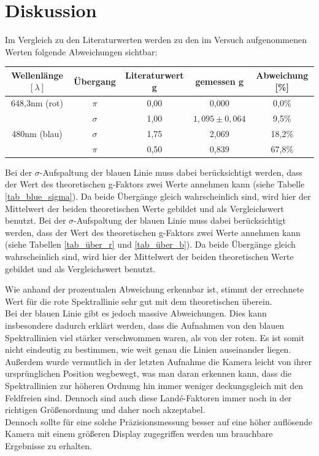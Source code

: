 \section{Diskussion}
Im Vergleich zu den Literaturwerten werden zu den im Versuch aufgenommenen Werten folgende Abweichungen sichtbar:
\begin{table}[htbp]
\begin{tabular}{|c|c|c|c|c|}
Wellenlänge $[\lambda]$ & Übergang & Literaturwert g& gemessen g& Abweichung [\%]\\\hline
648,3nm (rot) 	& $\pi$		&	0,00	&	0,000	&	0,0\%	\\\hline
				& $\sigma$	&	1,00	&	$1,095\pm0,064$	&	9,5\%	\\\hline
480nm (blau)	& $\sigma$	&	1,75	&	2,069	&	18,2\%\\\hline
				& $\pi$		&	0,50	&	0,839	&	67,8\%\\\hline
\end{tabular}
\end{table}


Bei der  $\sigma$-Aufspaltung der blauen Linie muss dabei berücksichtigt werden, dass der Wert des theoretischen g-Faktors zwei Werte annehmen kann (siehe Tabelle \ref{tab_blue_sigma}). Da beide Übergänge gleich wahrscheinlich sind, wird hier der Mittelwert der beiden theoretischen Werte gebildet und als Vergleichswert benutzt.
Bei der  $\sigma$-Aufspaltung der blauen Linie muss dabei berücksichtigt werden, dass der Wert des theoretischen g-Faktors zwei Werte annehmen kann (siehe Tabellen \ref{tab_über_r} und \ref{tab_über_b}). Da beide Übergänge gleich wahrscheinlich sind, wird hier der Mittelwert der beiden theoretischen Werte gebildet und als Vergleichswert benutzt.

Wie anhand der prozentualen Abweichung erkennbar ist, stimmt der errechnete Wert für die rote Spektrallinie sehr gut mit dem theoretischen überein.\\
Bei der blauen Linie gibt es jedoch massive Abweichungen. Dies kann insbesondere dadurch erklärt werden, dass die Aufnahmen von den blauen Spektrallinien viel stärker verschwommen waren, als von der roten. Es ist somit nicht eindeutig zu bestimmen, wie weit genau die Linien auseinander liegen. Außerdem wurde vermutlich in der letzten Aufnahme die Kamera leicht von ihrer ursprünglichen Position wegbewegt, was man daran erkennen kann, dass die Spektrallinien zur höheren Ordnung hin immer weniger deckungsgleich mit den Feldfreien sind. Dennoch sind auch diese Landé-Faktoren immer noch in der richtigen Größenordnung und daher noch akzeptabel.\\

Dennoch sollte für eine solche Präzisionsmessung besser auf eine höher auflösende Kamera mit einem größeren Display zugegriffen werden um brauchbare Ergebnisse zu erhalten.




